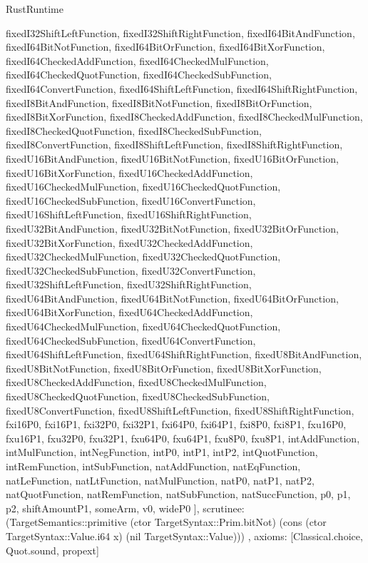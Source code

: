 \begin{lexlean}{RustRuntime}
\begin{semanticmodule}
{{      fixedI32ShiftLeftFunction,
      fixedI32ShiftRightFunction,
      fixedI64BitAndFunction,
      fixedI64BitNotFunction,
      fixedI64BitOrFunction,
      fixedI64BitXorFunction,
      fixedI64CheckedAddFunction,
      fixedI64CheckedMulFunction,
      fixedI64CheckedQuotFunction,
      fixedI64CheckedSubFunction,
      fixedI64ConvertFunction,
      fixedI64ShiftLeftFunction,
      fixedI64ShiftRightFunction,
      fixedI8BitAndFunction,
      fixedI8BitNotFunction,
      fixedI8BitOrFunction,
      fixedI8BitXorFunction,
      fixedI8CheckedAddFunction,
      fixedI8CheckedMulFunction,
      fixedI8CheckedQuotFunction,
      fixedI8CheckedSubFunction,
      fixedI8ConvertFunction,
      fixedI8ShiftLeftFunction,
      fixedI8ShiftRightFunction,
      fixedU16BitAndFunction,
      fixedU16BitNotFunction,
      fixedU16BitOrFunction,
      fixedU16BitXorFunction,
      fixedU16CheckedAddFunction,
      fixedU16CheckedMulFunction,
      fixedU16CheckedQuotFunction,
      fixedU16CheckedSubFunction,
      fixedU16ConvertFunction,
      fixedU16ShiftLeftFunction,
      fixedU16ShiftRightFunction,
      fixedU32BitAndFunction,
      fixedU32BitNotFunction,
      fixedU32BitOrFunction,
      fixedU32BitXorFunction,
      fixedU32CheckedAddFunction,
      fixedU32CheckedMulFunction,
      fixedU32CheckedQuotFunction,
      fixedU32CheckedSubFunction,
      fixedU32ConvertFunction,
      fixedU32ShiftLeftFunction,
      fixedU32ShiftRightFunction,
      fixedU64BitAndFunction,
      fixedU64BitNotFunction,
      fixedU64BitOrFunction,
      fixedU64BitXorFunction,
      fixedU64CheckedAddFunction,
      fixedU64CheckedMulFunction,
      fixedU64CheckedQuotFunction,
      fixedU64CheckedSubFunction,
      fixedU64ConvertFunction,
      fixedU64ShiftLeftFunction,
      fixedU64ShiftRightFunction,
      fixedU8BitAndFunction,
      fixedU8BitNotFunction,
      fixedU8BitOrFunction,
      fixedU8BitXorFunction,
      fixedU8CheckedAddFunction,
      fixedU8CheckedMulFunction,
      fixedU8CheckedQuotFunction,
      fixedU8CheckedSubFunction,
      fixedU8ConvertFunction,
      fixedU8ShiftLeftFunction,
      fixedU8ShiftRightFunction,
      fxi16P0,
      fxi16P1,
      fxi32P0,
      fxi32P1,
      fxi64P0,
      fxi64P1,
      fxi8P0,
      fxi8P1,
      fxu16P0,
      fxu16P1,
      fxu32P0,
      fxu32P1,
      fxu64P0,
      fxu64P1,
      fxu8P0,
      fxu8P1,
      intAddFunction,
      intMulFunction,
      intNegFunction,
      intP0,
      intP1,
      intP2,
      intQuotFunction,
      intRemFunction,
      intSubFunction,
      natAddFunction,
      natEqFunction,
      natLeFunction,
      natLtFunction,
      natMulFunction,
      natP0,
      natP1,
      natP2,
      natQuotFunction,
      natRemFunction,
      natSubFunction,
      natSuccFunction,
      p0,
      p1,
      p2,
      shiftAmountP1,
      someArm,
      v0,
      wideP0
    ],
    scrutinee: (TargetSemantics::primitive (ctor TargetSyntax::Prim.bitNot) (cons (ctor TargetSyntax::Value.i64 x) (nil TargetSyntax::Value)))
  },
  axioms: [Classical.choice, Quot.sound, propext]
}


\end{semanticmodule}
\end{lexlean}
